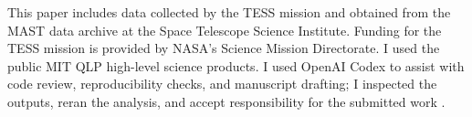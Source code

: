 \documentclass[default]{aastex702}
\begin{document}
\begin{acknowledgments}
This paper includes data collected by the TESS mission and obtained from the MAST data archive at the Space Telescope Science Institute. Funding for the TESS mission is provided by NASA's Science Mission Directorate. I used the public MIT QLP high-level science products. I used OpenAI Codex to assist with code review, reproducibility checks, and manuscript drafting; I inspected the outputs, reran the analysis, and accept responsibility for the submitted work \citep{openai2026,vishniac2023}.
\end{acknowledgments}





\end{document}
